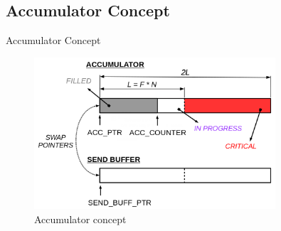 \subsection{Accumulator Concept}

\ifCommentInclude
\begin{frame}[t]{Accumulator Concept}
    \justifying
    
    \begin{figure}[htpb]
        \centering
        \includegraphics[width=0.8\textwidth]{figures/chapter-3/accumulator-concept.png}
        \caption{Accumulator concept} \label{fig:accumulator-concept}
    \end{figure}

\end{frame}
\fi

